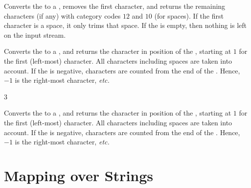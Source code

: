 \documentclass[oneside]{book}
\begin{document}
\begin{function}{\strVarTail}
\begin{syntax}
 
\end{syntax}
Converts the  to a , removes the first
character, and returns the remaining characters (if any)
with category codes $12$ and $10$ (for spaces).
If the first character is a space, it only trims that space.
If the  is empty,
then nothing is left on the input stream.
\begin{demohigh}
\strSet {}
\strVarTail \lTmpaStr
\end{demohigh}
\end{function}

\begin{function}{\strItem}
\begin{syntax}
  
\end{syntax}
Converts the  to a ,
and returns the character in position  of
the , starting at $1$ for the first (left-most)
character. All characters including spaces are taken into account.
If the  is negative,
characters are counted from the end of the . Hence,
$-1$ is the right-most character, \emph{etc.}
\begin{demohigh}
 {3}
\end{demohigh}
\end{function}

\begin{function}{\strVarItem}
\begin{syntax}
  
\end{syntax}
Converts the  to a ,
and returns the character in position  of
the , starting at $1$ for the first (left-most)
character. All characters including spaces are taken into account.
If the  is negative,
characters are counted from the end of the . Hence,
$-1$ is the right-most character, \emph{etc.}
\begin{demohigh}
\strSet {}
\strVarItem {}
\end{demohigh}
\end{function}

\section{Mapping over Strings}
\end{document}
